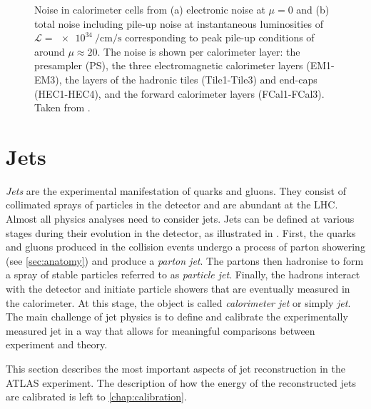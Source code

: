 \begin{figure}
        
    \caption{Noise in calorimeter cells from (a) electronic noise at $\mu=0$ and (b) total noise including pile-up noise at instantaneous luminosities of $\mathcal{L} = \SI{e34}{\per\cm\per\s}$ corresponding to peak pile-up conditions of around $\mu\approx20$. The noise is shown per calorimeter layer: the presampler (PS), the three electromagnetic calorimeter layers (EM1-EM3), the layers of the hadronic tiles (Tile1-Tile3) and end-caps (HEC1-HEC4), and the forward calorimeter layers (FCal1-FCal3). Taken from .}
    \label{fig:calo-noise}
\end{figure}


\section{Jets}
\emph{Jets} are the experimental manifestation of quarks and gluons.
They consist of collimated sprays of particles in the detector and are abundant at the LHC.
Almost all physics analyses need to consider jets. Jets can be defined at various stages during their evolution in the detector, as illustrated in . First, the quarks and gluons produced in the collision events undergo a process of parton showering (see \cref{sec:anatomy}) and produce a \emph{parton jet}. The partons then hadronise to form a spray of stable particles referred to as \emph{particle jet}. Finally, the hadrons interact with the detector and initiate particle showers that are eventually measured in the calorimeter. At this stage, the object is called \emph{calorimeter jet} or simply \emph{jet}.
The main challenge of jet physics is to define and calibrate the experimentally measured jet in a way that allows for meaningful comparisons between experiment and theory. 

This section describes the most important aspects of jet reconstruction in the ATLAS experiment.
The description of how the energy of the reconstructed jets are calibrated is left to \cref{chap:calibration}.

